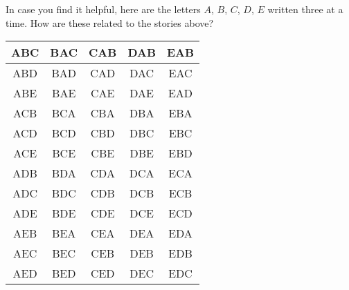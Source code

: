 \documentclass[nooutcomes, noauthor]{ximera}
\begin{document}
\newpage

In case you find it helpful, here are the letters $A$, $B$, $C$, $D$, $E$ written three at a time. How are these related to the stories above?
\huge \begin{center}
\begin{tabular} {|c|c|c|c|c|} \hline
ABC & BAC & CAB & DAB & EAB \\ \hline
ABD & BAD & CAD & DAC & EAC \\ \hline
ABE & BAE & CAE & DAE & EAD \\ \hline
ACB & BCA & CBA & DBA & EBA \\ \hline
ACD & BCD & CBD & DBC & EBC \\ \hline
ACE & BCE & CBE & DBE & EBD \\ \hline
ADB & BDA & CDA & DCA & ECA \\ \hline
ADC & BDC & CDB & DCB & ECB \\ \hline
ADE & BDE & CDE & DCE & ECD \\ \hline
AEB & BEA & CEA & DEA & EDA \\ \hline
AEC & BEC & CEB & DEB & EDB \\ \hline
AED & BED & CED & DEC & EDC \\ \hline

 \end{tabular}
\end{center} \rm

\newpage
\end{document}
